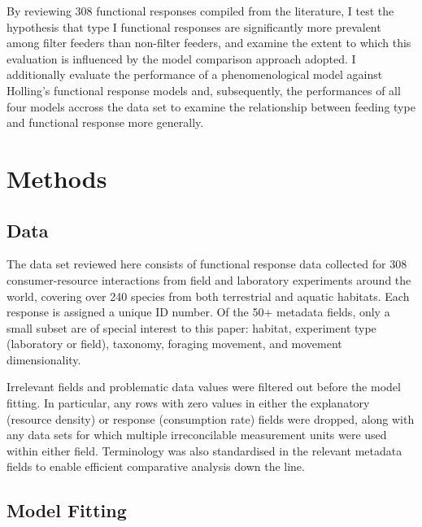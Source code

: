 \documentclass[11pt]{article}
\begin{document}
    By reviewing 308 functional responses compiled from the literature, I test the hypothesis that type I functional responses are significantly more prevalent among filter feeders than non-filter feeders, and examine the extent to which this evaluation is influenced by the model comparison approach adopted. I additionally evaluate the performance of a phenomenological model against Holling's functional response models and, subsequently, the performances of all four models accross the data set to examine the relationship between feeding type and functional response more generally.
    
    
    \section{Methods}
    
    \subsection{Data}
    The data set reviewed here consists of functional response data collected for 308 consumer-resource interactions from field and laboratory experiments around the world, covering over 240 species from both terrestrial and aquatic habitats. Each response is assigned a unique ID number. Of the 50+ metadata fields, only a small subset are of special interest to this paper: habitat, experiment type (laboratory or field), taxonomy, foraging movement, and movement dimensionality.
    
    Irrelevant fields and problematic data values were filtered out before the model fitting. In particular, any rows with zero values in either the explanatory (resource density) or response (consumption rate) fields were dropped, along with any data sets for which multiple irreconcilable measurement units were used within either field. Terminology was also standardised in the relevant metadata fields to enable efficient comparative analysis down the line. 
    
    \subsection{Model Fitting}
    
\end{document}
